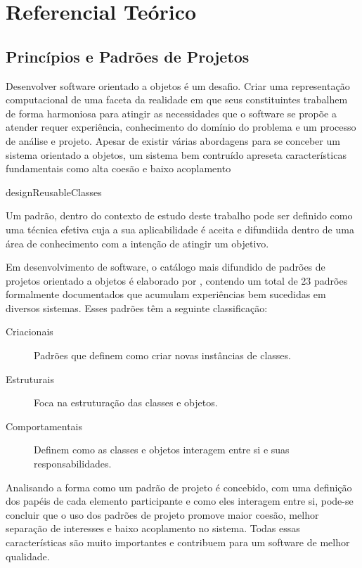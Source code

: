 \chapter{Referencial Teórico}

\section{Princípios e Padrões de Projetos}



Desenvolver software orientado a objetos é um desafio. Criar uma representação
computacional de uma faceta da realidade em que seus constituintes trabalhem de
forma harmoniosa para atingir as necessidades que o software se propõe a
atender requer experiência, conhecimento do domínio do problema e um processo de
análise e projeto. Apesar de existir várias abordagens para se conceber um
sistema orientado a objetos\cite{evans2004ddd},\cite{gomma11} um sistema bem
contruído apreseta características fundamentais como alta coesão e
baixo acoplamento 

designReusableClasses

Um padrão, dentro do contexto de estudo deste trabalho pode ser definido
como uma técnica efetiva cuja a sua aplicabilidade é aceita e difundiida dentro
de uma área de conhecimento com a intenção de atingir um
objetivo\cite{MetskerWake06}.

Em desenvolvimento de software, o catálogo mais difundido de padrões de projetos
orientado a objetos é elaborado por , contendo um total de 23
padrões formalmente documentados que acumulam experiências bem sucedidas em
diversos sistemas. Esses padrões têm a seguinte classificação:

\begin{description}
\item[Criacionais] Padrões que definem como criar novas instâncias de classes.
\item[Estruturais] Foca na estruturação das classes e objetos.
\item[Comportamentais] Definem como as classes e objetos interagem entre si e
suas responsabilidades.
\end{description}

Analisando a forma como um padrão de projeto é concebido, com uma definição
dos papéis de cada elemento participante e como eles interagem entre si,
pode-se concluir que o uso dos padrões de projeto promove maior coesão, melhor
separação de interesses e baixo acoplamento no sistema. Todas essas
características são muito importantes e contribuem para um software de melhor
qualidade.



